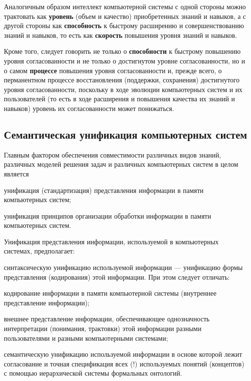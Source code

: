 Аналогичным образом интеллект компьютерной системы с одной стороны можно трактовать как \textbf{уровень} (объем и качество) приобретенных знаний и навыков, а с другой стороны как \textbf{способность} к быстрому расширению и совершенствованию знаний и навыков, то есть как \textbf{скорость} повышения уровня знаний и навыков.

Кроме того, следует говорить не только о \textbf{способности} к быстрому повышению уровня согласованности и не только о достигнутом уровне согласованности, но и о самом \textbf{процессе} повышения уровня согласованности и, прежде всего, о перманентном процессе восстановления (поддержки, сохранения) достигнутого уровня согласованности, поскольку в ходе эволюции компьютерных систем и их пользователей (то есть в ходе расширения и повышения качества их знаний и навыков) уровень их согласованности может понижаться.

\subsection{Семантическая унификация компьютерных систем}
\label{subsec_semantic_unification_computer_systems}
Главным фактором обеспечения совместимости различных видов знаний, различных моделей решения задач и различных компьютерных систем в целом является 
\begin{textitemize}
    \item унификация (стандартизация) представления информации в памяти компьютерных систем;
    \item унификация принципов организации обработки информации в памяти компьютерных систем.
\end{textitemize}

Унификация представления информации, используемой в компьютерных системах, предполагает:
\begin{textitemize}
    \item синтаксическую унификацию используемой информации --- унификацию формы представления (кодирования) этой информации. При этом следует отличать:
    \begin{textitemize}
	    	\item кодирование информации в памяти компьютерной системы (внутреннее представление информации);
	    	\item внешнее представление информации, обеспечивающее однозначность интерпретации (понимания, трактовки) этой информации разными пользователями и разными компьютерными системами;
	    \end{textitemize}
    \item семантическую унификацию используемой информации в основе которой лежит согласование и точная спецификация всех (!) используемых понятий (концептов) с помощью иерархической системы формальных онтологий.
\end{textitemize}

